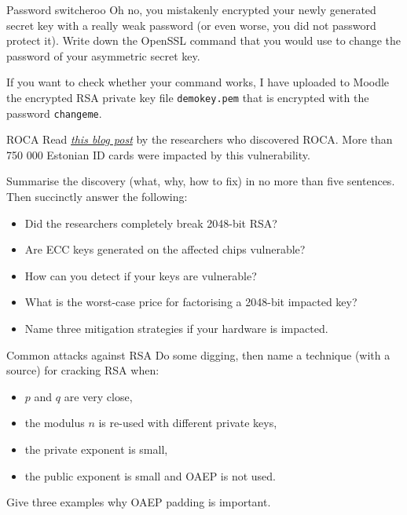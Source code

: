 \documentclass{homework}
\begin{document}
\begin{task}{Password switcheroo}
  Oh no, you mistakenly encrypted your newly generated secret key with a really weak password (or even worse, you did not password protect it).
  Write down the OpenSSL command that you would use to change the password of your asymmetric secret key.

  If you want to check whether your command works, I have uploaded to Moodle the encrypted RSA private key file \texttt{demokey.pem} that is encrypted with the password \texttt{changeme}.
\end{task}

\begin{task}{ROCA}
  Read \href{https://crocs.fi.muni.cz/public/papers/rsa_ccs17}{\emph{this blog post}} by the researchers who discovered ROCA.
  More than 750 000 Estonian ID cards were impacted by this vulnerability.

  Summarise the discovery (what, why, how to fix) in no more than five sentences.
  Then succinctly answer the following:
  \begin{itemize}
    \item Did the researchers completely break 2048-bit RSA?
    \item Are ECC keys generated on the affected chips vulnerable?
    \item How can you detect if your keys are vulnerable?
    \item What is the worst-case price for factorising a 2048-bit impacted key?
    \item Name three mitigation strategies if your hardware is impacted.
  \end{itemize}
\end{task}

\begin{task}{Common attacks against RSA}
  Do some digging, then name a technique (with a source) for cracking RSA when:
  \begin{itemize}
    \item $p$ and $q$ are very close,
    \item the modulus $n$ is re-used with different private keys,
    \item the private exponent is small,
    \item the public exponent is small and OAEP is not used.
  \end{itemize}

  Give three examples why OAEP padding is important.
\end{task}
\end{document}
